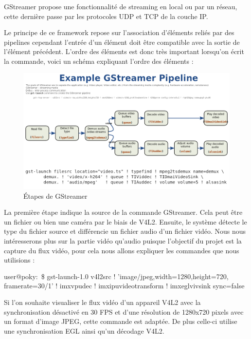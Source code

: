 GStreamer propose une fonctionnalité de streaming en local ou par un réseau, cette
dernière passe par les protocoles UDP et TCP de la couche IP.\medskip

Le principe de ce framework repose sur l’association d’éléments reliés par des pipelines
cependant l’entrée d’un élément doit être compatible avec la sortie de l’élément précédent.
L’ordre des éléments est donc très important lorsqu’on écrit la commande, voici un
schéma expliquant l’ordre des éléments :

\begin{figure}[!htb]
    \centering
    \includegraphics[trim={0cm 5cm 0cm 6cm},clip,scale=0.35]{Figures/gstreamer.png}
    \decoRule
    \caption{Étapes de GStreamer} \label{fig:gstreamer}
\end{figure}

La première étape indique la source de la commande GStreamer. Cela peut être un fichier
ou bien une caméra par le biais de V4L2. Ensuite, le système détecte le type du fichier
source et différencie un fichier audio d’un fichier vidéo.
Nous nous intéresserons plus sur la partie vidéo qu’audio puisque l’objectif du projet est la
capture du flux vidéo, pour cela nous allons expliquer les commandes que nous utilisions :

\begin{tcolorbox}
    user@poky:~\$ gst-launch-1.0 v4l2src ! 'image/jpeg,width=1280,height=720, \\ 
    framerate=30/1' ! imxvpudec ! imxipuvideotransform ! imxeglvivsink sync=false
\end{tcolorbox}

Si l’on souhaite visualiser le flux vidéo d’un appareil V4L2 avec la synchronisation
désactivé en 30 FPS et d’une résolution de 1280x720 pixels avec un format d’image
JPEG, cette commande est adaptée. De plus celle-ci utilise une synchronisation EGL ainsi
qu’un décodage V4L2.

